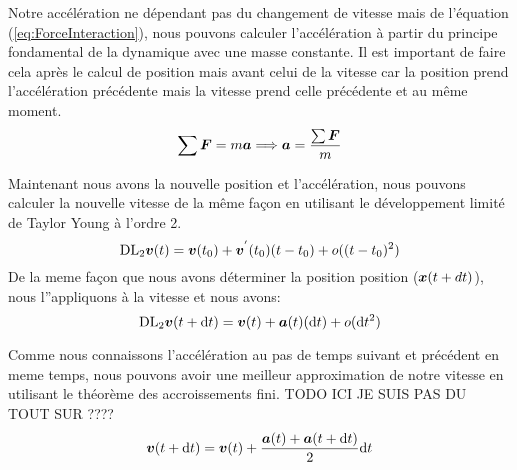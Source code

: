         Notre accélération ne dépendant pas du changement de vitesse mais de l'équation (\ref{eq:ForceInteraction}), nous pouvons calculer l'accélération à partir du principe fondamental de la dynamique avec une masse constante. Il est important de faire cela après le calcul de position mais avant celui de la vitesse car la position prend l'accélération précédente mais la vitesse prend celle précédente et au même moment.
        \begin{equation}
            \label{PFD}
            \sum  \vb*{F} = m\vb*{a} \Longrightarrow \vb*{a} = \frac{\sum \vb*{F}}{m}
        \end{equation}

        Maintenant nous avons la nouvelle position et l'accélération, nous pouvons calculer la nouvelle vitesse de la même façon en utilisant le développement limité de Taylor Young à l'ordre 2.%
        \begin{equation}
            \mathrm{DL}_2\vb*{v}(t) = \vb*{v}(t_0) + \vb*{v}^{'}(t_0)(t-t_0) + o((t-t_0)^2)
        \end{equation}
        De la meme façon que nous avons déterminer la position position ($\vb*{x}(t+dt)$), nous l''appliquons à la vitesse et nous avons:
        \begin{equation}
            \mathrm{DL}_2\vb*{v}(t+\mathrm{d}t) = \vb*{v}(t) + \vb*{a}(t)(\mathrm{d}t) + o(\mathrm{d}t^2)
        \end{equation}

        Comme nous connaissons l'accélération au pas de temps suivant et précédent en meme temps, nous pouvons avoir une meilleur approximation de notre vitesse en utilisant le théorème des accroissements fini. TODO ICI JE SUIS PAS DU TOUT SUR ????
        \begin{equation}
            \label{eq:verletVitesse}
            \vb*{v}(t+\mathrm{d}t) = \vb*{v}(t)+\frac{\vb*{a}(t)+\vb*{a}(t+\mathrm{d}t)}{2}\mathrm{d}t 
        \end{equation}
